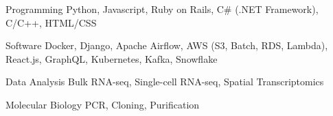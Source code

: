 

\begin{cvskills}

  \cvskill
    {Programming} %
    {Python, Javascript, Ruby on Rails, C\# (.NET Framework), C/C++, HTML/CSS} %

  \cvskill
    {Software} %
    {Docker, Django, Apache Airflow, AWS (S3, Batch, RDS, Lambda), React.js, GraphQL, Kubernetes, Kafka, Snowflake} %

  \cvskill
    {Data Analysis} %
    {Bulk RNA-seq, Single-cell RNA-seq, Spatial Transcriptomics} %

  \cvskill
    {Molecular Biology} %
    {PCR, Cloning, Purification} %

\end{cvskills}
